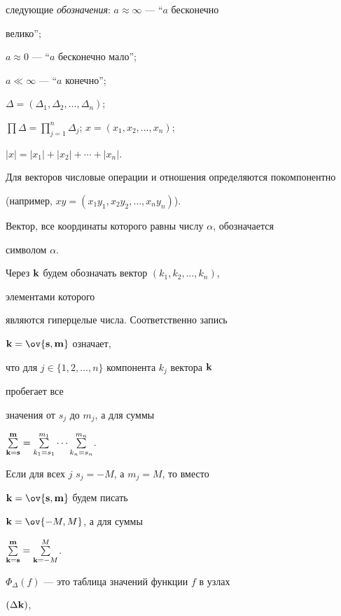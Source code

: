 следующие {\it обозначения}: $a\approx\infty$ --- ``$a$ бесконечно 


велико''; 


$a\approx 0$ --- ``$a$ бесконечно мало''; 


$a\ll\infty$ --- ``$a$ конечно''; 


$\Delta=(\Delta_1,\Delta_2,\dotsc,\Delta_n)$; 


$\prod\Delta=\prod\limits^n_{j=1}\Delta_j$; $x=(x_1,x_2,\dotsc,x_n)$; 


$|x|=|x_1|+|x_2|+\dotsb+|x_n|$. 


 


Для векторов числовые операции и отношения определяются покомпонентно 


(например, $xy=(x_1y_1,x_2y_2,\dotsc,x_n y_n)$). 


Вектор, все координаты которого равны числу $\alpha$, обозначается 


символом $\alpha$. 


 


Через $\bold k$ будем обозначать вектор $(k_1,k_2,\dotsc,k_n)$, 


элементами которого 


являются гиперцелые числа. Соответственно запись 


$\bold k=\ov{\bold s,\bold m}$ означает, 


что для $j\in\{1,2,\dotsc,n\}$ компонента $k_j$ вектора $\bold k$ 


пробегает все 


значения от $s_j$ до $m_j$, а для суммы 


$\sum\limits^{\bold m}_{\bold k=\bold s}= 


\sum\limits^{m_1}_{k_1=s_1}\dotsb 


\sum\limits^{m_n}_{k_n=s_n}$. 


Если для всех $j$\; $s_j=-M$, а $m_j=M$, то вместо 


$\bold k=\ov{\bold s,\bold m}$ будем писать 


$\bold k=\ov{-M,M}$, а для суммы 


$\sum\limits^{\bold m}_{\bold k=\bold s}= 


\sum\limits^M_{\bold k=-M}$. 


 


$\Phi_\Delta(f)$ --- это таблица значений функции $f$ в узлах 


$(\Delta\bold k)$, 


